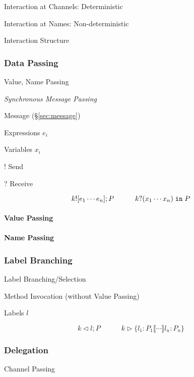 Interaction at Channels: Deterministic

Interaction at Names: Non-deterministic

Interaction Structure



\subsubsection{Data Passing}\label{sec:data_passing}

Value, Name Passing

\emph{Synchronous Message Passing}

Message (\S\ref{sec:message})

Expressions $e_i$

Variables $x_i$

$!$ Send

$?$ Receive

\[
    k![e_1 \cdots e_n]; P
    \quad\quad\quad
    k?(x_1 \cdots x_n) \; \mathtt{in} \; P
\]



\paragraph{Value Passing}\label{sec:value_passing}\hfill

\paragraph{Name Passing}\label{sec:name_passing}\hfill



\subsubsection{Label Branching}\label{sec:label_branching}

Label Branching/Selection

Method Invocation (without Value Passing)

Labels $l$

\[
  k \lhd l; P
  \quad\quad\quad
  k \rhd \{ l_1 : P_1 \llbracket \cdots \rrbracket l_n : P_n \}
\]



\subsubsection{Delegation}\label{sec:delegation}

Channel Passing

